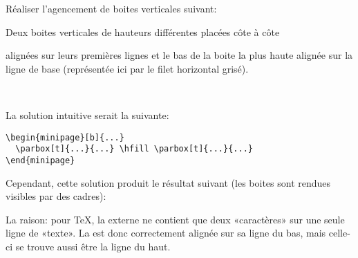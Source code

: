 \begin{exercice}
  \label{ex:boites:alignement-v}
  Réaliser l'agencement de boites verticales suivant:
  \begin{center}
    \begin{minipage}{0.8\linewidth}
      \makebox[0pt][l]{\color{lightgray}\rule{\linewidth}{0.7pt}}\relax
      \hfill
        \begin{minipage}[b]{0.95\linewidth}
          \small
          \parbox[t]{0.45\linewidth}{Deux boites verticales de
            hauteurs différentes placées côte à côte}
          \hfill
          \parbox[t]{0.45\linewidth}{alignées sur
            leurs premières lignes et le bas de la boite
            la plus haute alignée sur la ligne de base (représentée
            ici par le filet horizontal grisé).} \\
          \mbox{}
        \end{minipage}
      \hfill
    \end{minipage}
  \end{center}

  La solution intuitive serait la suivante:
\begin{lstlisting}
\begin{minipage}[b]{...}
  \parbox[t]{...}{...} \hfill \parbox[t]{...}{...}
\end{minipage}
\end{lstlisting}
  Cependant, cette solution produit le résultat suivant (les boites
  sont rendues visibles par des cadres):
  \begin{center}
    \begin{minipage}{0.8\linewidth}
      \makebox[0pt][l]{\color{lightgray}\rule{\linewidth}{0.7pt}}\relax
      \hfill
      \hfill
    \end{minipage}
  \end{center}
  La raison: pour {\TeX}, la  externe ne contient que
  deux «caractères» sur une seule ligne de «texte». La 
  est donc correctement alignée sur sa ligne du bas, mais celle-ci se
  trouve aussi être la ligne du haut.


\end{exercice}

